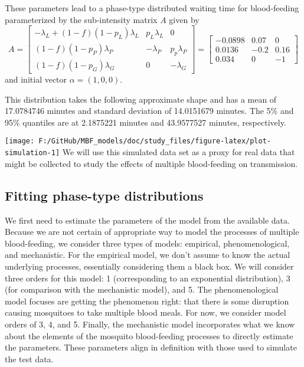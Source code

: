 \documentclass[
]{article}
\begin{document}
These parameters lead to a phase-type distributed waiting time for
blood-feeding parameterized by the sub-intensity matrix \(A\) given by
\[
A = \begin{bmatrix}-\lambda_{L}+\left(1-f\right)\left(1-p_{L}\right)\lambda_{L} & p_{L}\lambda_{L} & 0\\
\left(1-f\right)\left(1-p_{P}\right)\lambda_{P} & -\lambda_{P} & p_{p}\lambda_{P}\\
\left(1-f\right)\left(1-p_{G}\right)\lambda_{G} & 0 & -\lambda_{G}
\end{bmatrix}  = \begin{bmatrix} -0.0898 & 0.07 & 0\\
0.0136 & -0.2 & 0.16\\
0.034 & 0 & -1
\end{bmatrix}
\] and initial vector \(\alpha = \left(1,0,0\right)\).

This distribution takes the following approximate shape and has a mean
of 17.0784746 minutes and standard deviation of 14.0151679 minutes. The
5\% and 95\% quantiles are at 2.1875221 minutes and 43.9577527 minutes,
respectively.

\texttt{[image: F:/GitHub/MBF\_models/doc/study\_files/figure-latex/plot-simulation-1]}
We will use this simulated data set as a proxy for real data that might
be collected to study the effects of multiple blood-feeding on
transmission.

\hypertarget{fitting-phase-type-distributions}{%
\subsection{Fitting phase-type
distributions}\label{fitting-phase-type-distributions}}

We first need to estimate the parameters of the model from the available
data. Because we are not certain of appropriate way to model the
processes of multiple blood-feeding, we consider three types of models:
empirical, phenomenological, and mechanistic. For the empirical model,
we don't assume to know the actual underlying processes, essentially
considering them a black box. We will consider three orders for this
model: 1 (corresponding to an exponential distribution), 3 (for
comparison with the mechanistic model), and 5. The phenomenological
model focuses are getting the phenomenon right: that there is some
disruption causing mosquitoes to take multiple blood meals. For now, we
consider model orders of 3, 4, and 5. Finally, the mechanistic model
incorporates what we know about the elements of the mosquito
blood-feeding processes to directly estimate the parameters. These
parameters align in definition with those used to simulate the test
data.
\end{document}
